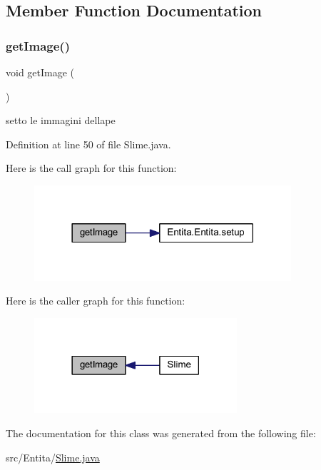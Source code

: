 \subsection{Member Function Documentation}
\mbox{\label{class_entita_1_1_slime_acd4bd75c24769238f365de299bde96ac}} 
\subsubsection{\texorpdfstring{get\+Image()}{getImage()}}
{\footnotesize\ttfamily void get\+Image (\begin{DoxyParamCaption}{ }\end{DoxyParamCaption})}



setto le immagini dell\textquotesingle{}ape 



Definition at line 50 of file Slime.\+java.

Here is the call graph for this function\+:
\nopagebreak
\begin{figure}[H]
\begin{center}
\leavevmode
\includegraphics[width=270pt]{class_entita_1_1_slime_acd4bd75c24769238f365de299bde96ac_cgraph}
\end{center}
\end{figure}
Here is the caller graph for this function\+:
\nopagebreak
\begin{figure}[H]
\begin{center}
\leavevmode
\includegraphics[width=213pt]{class_entita_1_1_slime_acd4bd75c24769238f365de299bde96ac_icgraph}
\end{center}
\end{figure}


The documentation for this class was generated from the following file\+:\begin{DoxyCompactItemize}
\item 
src/\+Entita/\hyperlink{_slime_8java}{Slime.\+java}\end{DoxyCompactItemize}
